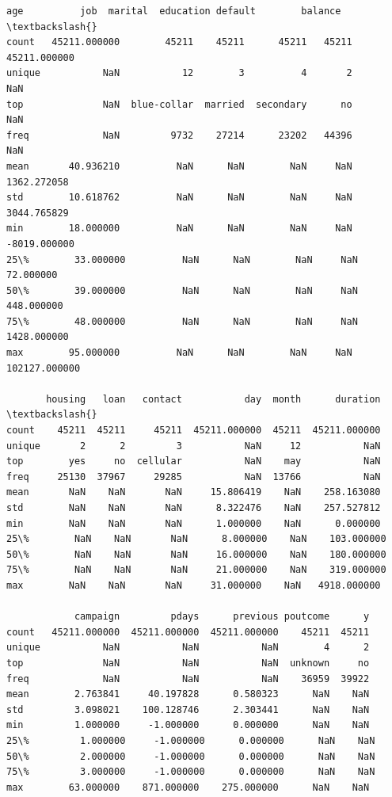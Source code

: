 \documentclass[11pt]{article}
\makeatletter
\newcommand{\boxspacing}{\kern\kvtcb@left@rule\kern\kvtcb@boxsep}
\newcommand{\prompt}[4]{
        {\ttfamily\llap{{\color{#2}[#3]:\hspace{3pt}#4}}\vspace{-\baselineskip}}
    }
\makeatother
\begin{document}
            \begin{tcolorbox}[breakable, size=fbox, boxrule=.5pt, pad at break*=1mm, opacityfill=0]
\prompt{Out}{outcolor}{3}{\boxspacing}
\begin{Verbatim}[commandchars=\\\{\}]
                 age          job  marital  education default        balance  \textbackslash{}
count   45211.000000        45211    45211      45211   45211   45211.000000
unique           NaN           12        3          4       2            NaN
top              NaN  blue-collar  married  secondary      no            NaN
freq             NaN         9732    27214      23202   44396            NaN
mean       40.936210          NaN      NaN        NaN     NaN    1362.272058
std        10.618762          NaN      NaN        NaN     NaN    3044.765829
min        18.000000          NaN      NaN        NaN     NaN   -8019.000000
25\%        33.000000          NaN      NaN        NaN     NaN      72.000000
50\%        39.000000          NaN      NaN        NaN     NaN     448.000000
75\%        48.000000          NaN      NaN        NaN     NaN    1428.000000
max        95.000000          NaN      NaN        NaN     NaN  102127.000000

       housing   loan   contact           day  month      duration  \textbackslash{}
count    45211  45211     45211  45211.000000  45211  45211.000000
unique       2      2         3           NaN     12           NaN
top        yes     no  cellular           NaN    may           NaN
freq     25130  37967     29285           NaN  13766           NaN
mean       NaN    NaN       NaN     15.806419    NaN    258.163080
std        NaN    NaN       NaN      8.322476    NaN    257.527812
min        NaN    NaN       NaN      1.000000    NaN      0.000000
25\%        NaN    NaN       NaN      8.000000    NaN    103.000000
50\%        NaN    NaN       NaN     16.000000    NaN    180.000000
75\%        NaN    NaN       NaN     21.000000    NaN    319.000000
max        NaN    NaN       NaN     31.000000    NaN   4918.000000

            campaign         pdays      previous poutcome      y
count   45211.000000  45211.000000  45211.000000    45211  45211
unique           NaN           NaN           NaN        4      2
top              NaN           NaN           NaN  unknown     no
freq             NaN           NaN           NaN    36959  39922
mean        2.763841     40.197828      0.580323      NaN    NaN
std         3.098021    100.128746      2.303441      NaN    NaN
min         1.000000     -1.000000      0.000000      NaN    NaN
25\%         1.000000     -1.000000      0.000000      NaN    NaN
50\%         2.000000     -1.000000      0.000000      NaN    NaN
75\%         3.000000     -1.000000      0.000000      NaN    NaN
max        63.000000    871.000000    275.000000      NaN    NaN
\end{Verbatim}
\end{tcolorbox}
        
\end{document}
